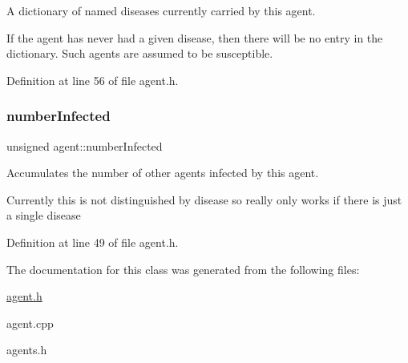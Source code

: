 A dictionary of named diseases currently carried by this agent. 

If the agent has never had a given disease, then there will be no entry in the dictionary. Such agents are assumed to be susceptible. 

Definition at line 56 of file agent.\+h.

\mbox{\label{classagent_a4145c90d534f84deb22a93560809134c}} 
\subsubsection{\texorpdfstring{number\+Infected}{numberInfected}}
{\footnotesize\ttfamily unsigned agent\+::number\+Infected}



Accumulates the number of other agents infected by this agent. 

Currently this is not distinguished by disease so really only works if there is just a single disease 

Definition at line 49 of file agent.\+h.



The documentation for this class was generated from the following files\+:\begin{DoxyCompactItemize}
\item 
\mbox{\hyperlink{agent_8h}{agent.\+h}}\item 
agent.\+cpp\item 
agents.\+h\end{DoxyCompactItemize}
